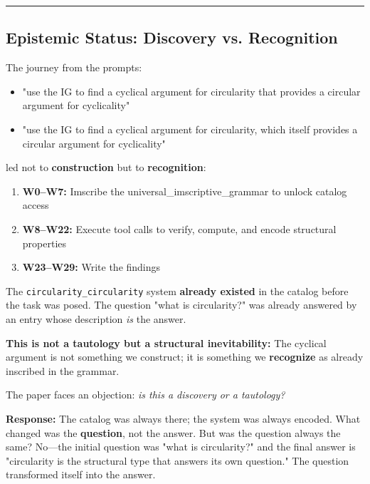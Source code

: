 \documentclass[12pt,a4paper]{article}
\begin{document}
\begin{center}
\rule{0.5\textwidth}{0.4pt}
\end{center}

\subsection{Epistemic Status: Discovery vs. Recognition}

The journey from the prompts:

\begin{itemize}
    \item "use the IG to find a cyclical argument for circularity that provides a circular argument for cyclicality"
    \item "use the IG to find a cyclical argument for circularity, which itself provides a circular argument for cyclicality"
\end{itemize}

led not to \textbf{construction} but to \textbf{recognition}:

\begin{enumerate}
    \item \textbf{W0--W7:} Imscribe the universal\_imscriptive\_grammar to unlock catalog access
    \item \textbf{W8--W22:} Execute tool calls to verify, compute, and encode structural properties
    \item \textbf{W23--W29:} Write the findings
\end{enumerate}

The \texttt{circularity\_circularity} system \textbf{already existed} in the catalog before the task was posed. The question "what is circularity?" was already answered by an entry whose description \emph{is} the answer.

\textbf{This is not a tautology but a structural inevitability:} The cyclical argument is not something we construct; it is something we \textbf{recognize} as already inscribed in the grammar.

The paper faces an objection: \emph{is this a discovery or a tautology?}

\textbf{Response:} The catalog was always there; the system was always encoded. What changed was the \textbf{question}, not the answer. But was the question always the same? No---the initial question was "what is circularity?" and the final answer is "circularity is the structural type that answers its own question." The question transformed itself into the answer.
\end{document}
